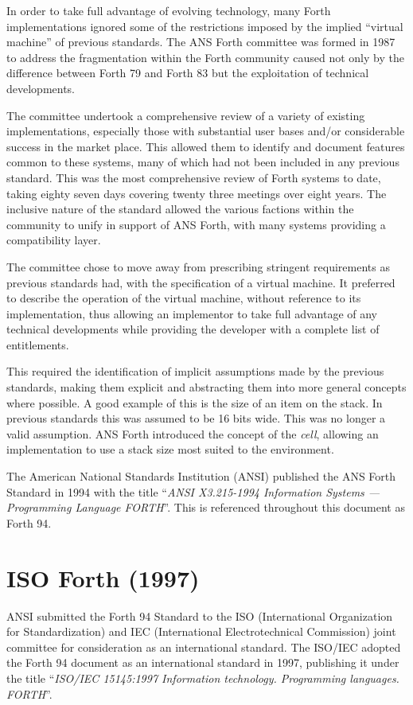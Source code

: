 In order to take full advantage of evolving technology, many Forth
implementations ignored some of the restrictions imposed by the
implied ``virtual machine'' of previous standards.
The ANS Forth committee was formed in 1987 to address the fragmentation
within the Forth community caused not only by the difference between
Forth 79 and Forth 83 but the exploitation of technical developments.

The committee undertook a comprehensive review of a variety of existing
implementations, especially those with substantial user bases and/or
considerable success in the market place.  This allowed them to identify
and document features common to these systems, many of which had not been
included in any previous standard.
This was the most comprehensive review of Forth systems to date, taking
eighty seven days covering twenty three meetings over eight years.
The inclusive nature of the standard allowed the various factions within
the community to unify in support of ANS Forth, with many systems
providing a compatibility layer.


The committee chose to move away from prescribing stringent requirements
as previous standards had, with the specification of a virtual machine.
It preferred to describe the operation of the virtual machine, without
reference to its implementation, thus allowing an implementor to take
full advantage of any technical developments while providing the
developer with a complete list of entitlements.

This required the identification of implicit assumptions made by the
previous standards, making them explicit and abstracting them into
more general concepts where possible.  A good example of this is the
size of an item on the stack.  In previous standards this was assumed
to be 16 bits wide.  This was no longer a valid assumption.  ANS Forth
introduced the concept of the \emph{cell}, allowing an implementation
to use a stack size most suited to the environment.

The American National Standards Institution (ANSI) published the ANS
Forth Standard in 1994 with the title ``\emph{ANSI X3.215-1994
Information Systems --- Programming Language FORTH}''.  This is referenced
throughout this document as Forth 94.

\section{ISO Forth (1997)}
\label{diff:iso}

ANSI submitted the Forth 94 Standard to the
ISO (International Organization for Standardization) and
IEC (International Electrotechnical Commission) joint committee for
consideration as an international standard.
The ISO/IEC adopted the Forth 94 document as an international standard
in 1997, publishing it under the title ``\emph{ISO/IEC 15145:1997
Information technology.  Programming languages.  FORTH}''.


